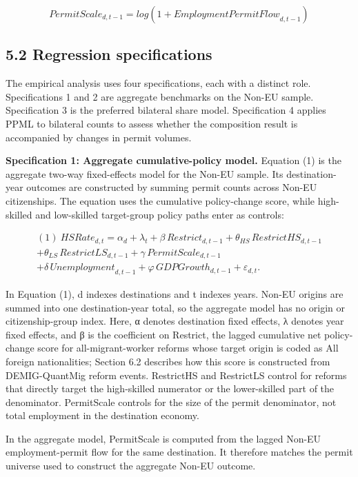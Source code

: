 \documentclass[11pt,a4paper]{article}
\begin{document}
\[{PermitScale}_{d,t - 1} = log\left( 1 + {EmploymentPermitFlow}_{d,t - 1} \right)\]

\clearpage
\subsection{5.2 Regression
specifications}\label{regression-specifications}

The empirical analysis uses four specifications, each with a distinct
role. Specifications 1 and 2 are aggregate benchmarks on the Non-EU
sample. Specification 3 is the preferred bilateral share model.
Specification 4 applies PPML to bilateral counts to assess whether the
composition result is accompanied by changes in permit volumes.

\textbf{Specification 1: Aggregate cumulative-policy model.} Equation
(1) is the aggregate two-way fixed-effects model for the Non-EU sample.
Its destination-year outcomes are constructed by summing permit counts
across Non-EU citizenships. The equation uses the cumulative
policy-change score, while high-skilled and low-skilled target-group
policy paths enter as controls:

\[\begin{array}{r}
(1)\ {HSRate}_{d,t} = \alpha_{d} + \lambda_{t} + \beta\,{Restrict}_{d,t - 1} + \theta_{HS}\,{RestrictHS}_{d,t - 1} \\
 + \theta_{LS}\,{RestrictLS}_{d,t - 1} + \gamma\,{PermitScale}_{d,t - 1} \\
 + \delta\,{Unemployment}_{d,t - 1} + \varphi\,{GDPGrowth}_{d,t - 1} + \varepsilon_{d,t}.
\end{array}\]

In Equation (1), d indexes destinations and t indexes years. Non-EU
origins are summed into one destination-year total, so the aggregate
model has no origin or citizenship-group index. Here, α denotes
destination fixed effects, λ denotes year fixed effects, and β is the
coefficient on Restrict, the lagged cumulative net policy-change score
for all-migrant-worker reforms whose target origin is coded as All
foreign nationalities; Section 6.2 describes how this score is
constructed from DEMIG-QuantMig reform events. RestrictHS and RestrictLS
control for reforms that directly target the high-skilled numerator or
the lower-skilled part of the denominator. PermitScale controls for the
size of the permit denominator, not total employment in the destination
economy.

In the aggregate model, PermitScale is computed from the lagged Non-EU
employment-permit flow for the same destination. It therefore matches
the permit universe used to construct the aggregate Non-EU outcome.
\end{document}
